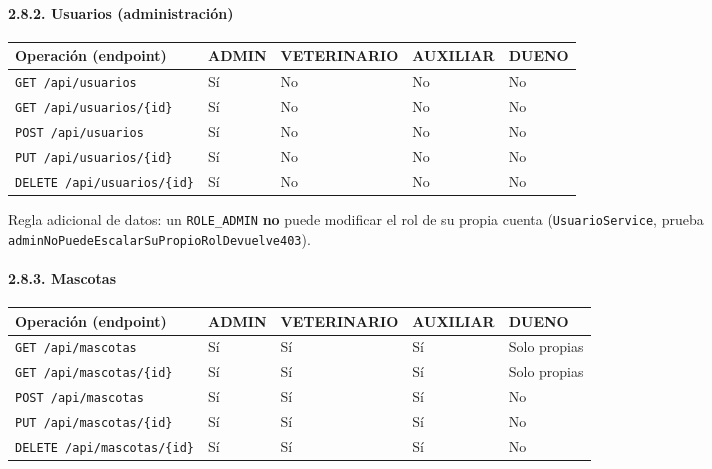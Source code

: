 \documentclass[
  spanish,
]{article}
\newcounter{none} %
\begin{document}
\paragraph{2.8.2. Usuarios
(administración)}\label{usuarios-administraciuxf3n}

{\def\LTcaptype{none} %
\begin{longtable}[]{@{}lllll@{}}
\toprule\noalign{}
Operación (endpoint) & ADMIN & VETERINARIO & AUXILIAR & DUENO \\
\midrule\noalign{}
\endhead
\bottomrule\noalign{}
\endlastfoot
\texttt{GET\ /\allowbreak{}api/\allowbreak{}usuarios} & Sí & No & No & No \\
\texttt{GET\ /\allowbreak{}api/\allowbreak{}usuarios/\allowbreak{}\{id\}} & Sí & No & No & No \\
\texttt{POST\ /\allowbreak{}api/\allowbreak{}usuarios} & Sí & No & No & No \\
\texttt{PUT\ /\allowbreak{}api/\allowbreak{}usuarios/\allowbreak{}\{id\}} & Sí & No & No & No \\
\texttt{DELETE\ /\allowbreak{}api/\allowbreak{}usuarios/\allowbreak{}\{id\}} & Sí & No & No & No \\
\end{longtable}
}

Regla adicional de datos: un \texttt{ROLE\_\allowbreak{}ADMIN} \textbf{no} puede
modificar el rol de su propia cuenta (\texttt{Usuario\allowbreak{}Service}, prueba
\texttt{admin\allowbreak{}No\allowbreak{}Puede\allowbreak{}Escalar\allowbreak{}Su\allowbreak{}Propio\allowbreak{}Rol\allowbreak{}Devuelve403}).

\paragraph{2.8.3. Mascotas}\label{mascotas}

{\def\LTcaptype{none} %
\begin{longtable}[]{@{}lllll@{}}
\toprule\noalign{}
Operación (endpoint) & ADMIN & VETERINARIO & AUXILIAR & DUENO \\
\midrule\noalign{}
\endhead
\bottomrule\noalign{}
\endlastfoot
\texttt{GET\ /\allowbreak{}api/\allowbreak{}mascotas} & Sí & Sí & Sí & Solo propias \\
\texttt{GET\ /\allowbreak{}api/\allowbreak{}mascotas/\allowbreak{}\{id\}} & Sí & Sí & Sí & Solo propias \\
\texttt{POST\ /\allowbreak{}api/\allowbreak{}mascotas} & Sí & Sí & Sí & No \\
\texttt{PUT\ /\allowbreak{}api/\allowbreak{}mascotas/\allowbreak{}\{id\}} & Sí & Sí & Sí & No \\
\texttt{DELETE\ /\allowbreak{}api/\allowbreak{}mascotas/\allowbreak{}\{id\}} & Sí & Sí & Sí & No \\
\end{longtable}
}
\end{document}
